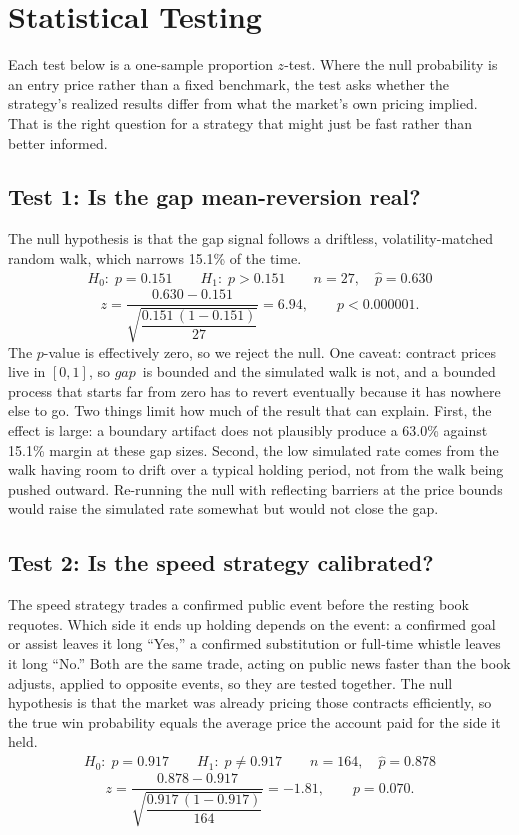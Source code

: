 \documentclass[12pt]{article}
\newcommand{\gap}{\ensuremath{\mathit{gap}}}
\begin{document}
\section{Statistical Testing}

Each test below is a one-sample proportion $z$-test. Where the null probability
is an entry price rather than a fixed benchmark, the test asks whether the
strategy's realized results differ from what the market's own pricing implied.
That is the right question for a strategy that might just be fast rather than
better informed.

\subsection{Test 1: Is the gap mean-reversion real?}

The null hypothesis is that the gap signal follows a driftless,
volatility-matched random walk, which narrows 15.1\% of the time.
\begin{align*}
H_0:\; p = 0.151 \qquad H_1:\; p > 0.151 \qquad
n = 27, \quad \hat p = 0.630
\end{align*}
\[
z = \frac{0.630 - 0.151}{\sqrt{\dfrac{0.151\,(1 - 0.151)}{27}}} = 6.94,
\qquad p < 0.000001.
\]
The $p$-value is effectively zero, so we reject the null. One caveat: contract
prices live in $[0,1]$, so \gap\ is bounded and the simulated walk is not, and a
bounded process that starts far from zero has to revert eventually because it has
nowhere else to go. Two things limit how much of the result that can explain.
First, the effect is large: a boundary artifact does not plausibly produce a
63.0\% against 15.1\% margin at these gap sizes. Second, the low simulated rate
comes from the walk having room to drift over a typical holding period, not from
the walk being pushed outward. Re-running the null with reflecting barriers at
the price bounds would raise the simulated rate somewhat but would not close the
gap.

\subsection{Test 2: Is the speed strategy calibrated?}

The speed strategy trades a confirmed public event before the resting book
requotes. Which side it ends up holding depends on the event: a confirmed goal or
assist leaves it long ``Yes,'' a confirmed substitution or full-time whistle
leaves it long ``No.'' Both are the same trade, acting on public news faster than
the book adjusts, applied to opposite events, so they are tested together. The
null hypothesis is that the market was already pricing those contracts
efficiently, so the true win probability equals the average price the account
paid for the side it held.
\begin{align*}
H_0:\; p = 0.917 \qquad H_1:\; p \neq 0.917 \qquad
n = 164, \quad \hat p = 0.878
\end{align*}
\[
z = \frac{0.878 - 0.917}{\sqrt{\dfrac{0.917\,(1 - 0.917)}{164}}} = -1.81,
\qquad p = 0.070.
\]
\end{document}
